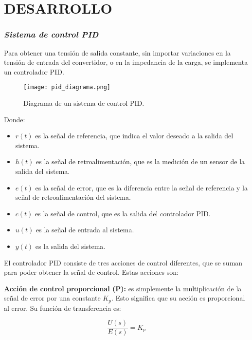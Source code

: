 \section*{\large{DESARROLLO}}
\vspace{-0.25cm}
\justifying

\subsubsection*{\it{Sistema de control PID}}
\vspace{-0.25cm}
Para obtener una tensión de salida constante, sin importar variaciones en la tensión de entrada del
convertidor, o en la impedancia de la carga, se implementa un controlador PID.

\begin{figure}[H]
    \centering
    \texttt{[image: pid\_diagrama.png]}
    \vspace{-0.25cm}
    \caption{Diagrama de un sistema de control PID. \parencite{PICUINO}}
    \label{fig:pid_diagrama}
\end{figure}
\vspace{-0.5cm}

Donde:
\begin{itemize}[noitemsep]
    \item $r(t)$ es la señal de referencia, que indica el valor deseado a la salida del sistema.
    \item $h(t)$ es la señal de retroalimentación, que es la medición de un sensor de la salida del sistema.
    \item $e(t)$ es la señal de error, que es la diferencia entre la señal de referencia y la señal de
          retroalimentación del sistema.
    \item $c(t)$ es la señal de control, que es la salida del controlador PID.
    \item $u(t)$ es la señal de entrada al sistema.
    \item $y(t)$ es la salida del sistema.
\end{itemize}

El controlador PID consiste de tres acciones de control diferentes, que se suman para poder
obtener la señal de control. Estas acciones son:

\textbf{Acción de control proporcional (P):} es simplemente la multiplicación de la señal de error por
una constante $K_p$. Esto significa que su acción es proporcional al error. Su función de transferencia es:

\vspace{-0.5cm}
\begin{equation}
    \dfrac{U(s)}{E(s)} = K_p
\end{equation}
\vspace{-0.5cm}

